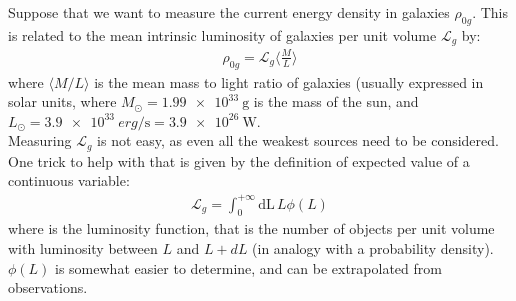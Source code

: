 \documentclass[../PhysUniverse.tex]{subfiles}
\begin{document}
Suppose that we want to measure the current energy density in galaxies $\rho_{0g}$. This is related to the mean intrinsic luminosity of galaxies per unit volume $\mathcal{L}_g$ by:
\begin{align*}
\rho_{0g} = \mathcal{L}_g \langle \frac{M}{L}\rangle
\end{align*}
where $\langle M/L\rangle$ is the mean mass to light ratio of galaxies (usually expressed in solar units, where $M_\odot = \SI{1.99e33}{\g}$ is the mass of the sun, and $L_\odot = \SI{3.9e33}{erg \per \s} = \SI{3.9e26}{\watt}$.\\
Measuring $\mathcal{L}_g$ is not easy, as even all the weakest sources need to be considered. One trick to help with that is given by the definition of expected value of a continuous variable:
\begin{align*}
\mathcal{L}_g = \int_0^{+\infty} \mathrm{dL}\, L \phi(L)
\end{align*}
where is the luminosity function, that is the number of objects per unit volume with luminosity between $L$ and $L+dL$ (in analogy with a probability density).\\
$\phi(L)$ is somewhat easier to determine, and can be extrapolated from observations.
\end{document}

